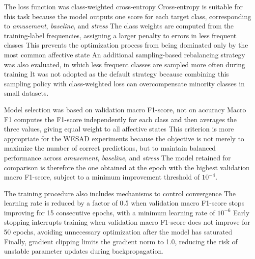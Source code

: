 \documentclass[12pt]{article}
\begin{document}
The loss function was class-weighted cross-entropy Cross-entropy is suitable for this task because the model outputs one score for each target class, corresponding to \textit{amusement}, \textit{baseline}, and \textit{stress} The class weights are computed from the training-label frequencies, assigning a larger penalty to errors in less frequent classes This prevents the optimization process from being dominated only by the most common affective state An additional sampling-based rebalancing strategy was also evaluated, in which less frequent classes are sampled more often during training It was not adopted as the default strategy because combining this sampling policy with class-weighted loss can overcompensate minority classes in small datasets.

Model selection was based on validation macro F1-score, not on accuracy Macro F1 computes the F1-score independently for each class and then averages the three values, giving equal weight to all affective states This criterion is more appropriate for the WESAD experiments because the objective is not merely to maximize the number of correct predictions, but to maintain balanced performance across \textit{amusement}, \textit{baseline}, and \textit{stress} The model retained for comparison is therefore the one obtained at the epoch with the highest validation macro F1-score, subject to a minimum improvement threshold of $10^{-4}$.

The training procedure also includes mechanisms to control convergence The learning rate is reduced by a factor of 0.5 when validation macro F1-score stops improving for 15 consecutive epochs, with a minimum learning rate of $10^{-6}$ Early stopping interrupts training when validation macro F1-score does not improve for 50 epochs, avoiding unnecessary optimization after the model has saturated Finally, gradient clipping limits the gradient norm to 1.0, reducing the risk of unstable parameter updates during backpropagation.
\end{document}
